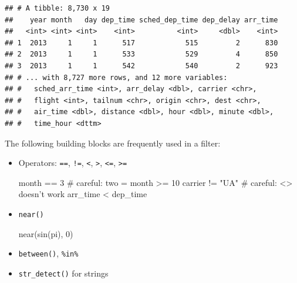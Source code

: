 \documentclass[]{book}
\newenvironment{Shaded}{}{}
\newcommand{\CommentTok}[1]{\textcolor[rgb]{0.00,0.50,0.00}{#1}}
\newcommand{\DecValTok}[1]{#1}
\newcommand{\KeywordTok}[1]{\textcolor[rgb]{0.00,0.00,1.00}{#1}}
\newcommand{\NormalTok}[1]{#1}
\newcommand{\OperatorTok}[1]{#1}
\newcommand{\StringTok}[1]{\textcolor[rgb]{0.00,0.50,0.50}{#1}}
\begin{document}
\begin{verbatim}
## # A tibble: 8,730 x 19
##    year month   day dep_time sched_dep_time dep_delay arr_time
##   <int> <int> <int>    <int>          <int>     <dbl>    <int>
## 1  2013     1     1      517            515         2      830
## 2  2013     1     1      533            529         4      850
## 3  2013     1     1      542            540         2      923
## # ... with 8,727 more rows, and 12 more variables:
## #   sched_arr_time <int>, arr_delay <dbl>, carrier <chr>,
## #   flight <int>, tailnum <chr>, origin <chr>, dest <chr>,
## #   air_time <dbl>, distance <dbl>, hour <dbl>, minute <dbl>,
## #   time_hour <dttm>
\end{verbatim}

The following building blocks are frequently used in a filter:

\begin{itemize}
\item
  Operators: \texttt{==}, \texttt{!=}, \texttt{\textless{}}, \texttt{\textgreater{}}, \texttt{\textless{}=}, \texttt{\textgreater{}=}

\begin{Shaded}
\begin{Highlighting}[]
\NormalTok{month }\OperatorTok{==}\StringTok{ }\DecValTok{3}              \CommentTok{# careful: two =}
\NormalTok{month }\OperatorTok{>=}\StringTok{ }\DecValTok{10}
\NormalTok{carrier }\OperatorTok{!=}\StringTok{ "UA"}         \CommentTok{# careful: <> doesn't work}
\NormalTok{arr_time }\OperatorTok{<}\StringTok{ }\NormalTok{dep_time}
\end{Highlighting}
\end{Shaded}
\item
  \texttt{near()}

\begin{Shaded}
\begin{Highlighting}[]
\KeywordTok{near}\NormalTok{(}\KeywordTok{sin}\NormalTok{(pi), }\DecValTok{0}\NormalTok{)}
\end{Highlighting}
\end{Shaded}
\item
  \texttt{between()}, \texttt{\%in\%}

\begin{Shaded}
\end{Shaded}
\item
  \texttt{str\_detect()} for strings
\end{itemize}
\end{document}
